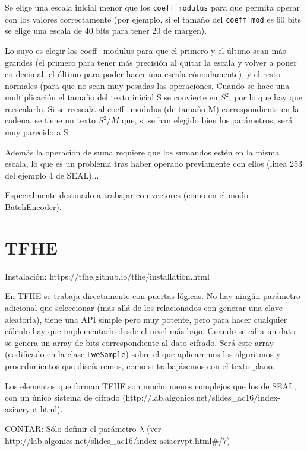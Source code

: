 \begin{itemize}
  Se elige una escala inicial menor que los \verb|coeff_modulus| para que permita operar con los valores correctamente (por ejemplo, si el tamaño del \verb|coeff_mod| es 60 bits se elige una escala de 40 bits para tener 20 de margen).

  Lo suyo es elegir los coeff\_modulus para que el primero y el último sean más grandes (el primero para tener más precisión al quitar la escala y volver a poner en decimal, el último para poder hacer una escala cómodamente), y el resto normales (para que no sean muy pesadas las operaciones. Cuando se hace una multiplicación el tamaño del texto inicial S se convierte en $S^2$, por lo que hay que reescalarlo. Si se reescala al coeff\_modulus (de tamaño M) correspondiente en la cadena, se tiene un texto $S^2/M$ que, si se han elegido bien los parámetros, será muy parecido a S.

  Además la operación de suma requiere que los sumandos estén en la misma escala, lo que es un problema tras haber operado previamente con ellos (linea 253 del ejemplo 4 de SEAL)...

  Especialmente destinado a trabajar con vectores (como en el modo BatchEncoder).

\end{itemize}

\section{TFHE}


Instalación: https://tfhe.github.io/tfhe/installation.html

En TFHE se trabaja directamente con puertas lógicas. No hay ningún parámetro adicional que seleccionar (mas allá de los relacionados con generar una clave aleatoria), tiene una API simple pero muy potente, pero para hacer cualquier cálculo hay que implementarlo desde el nivel más bajo. Cuando se cifra un dato se genera un array de bits correspondiente al dato cifrado. Será este array (codificado en la clase \verb|LweSample|) sobre el que aplicaremos los algoritmos y procedimientos que diseñaremos, como si trabajásemos con el texto plano.

Los elementos que forman TFHE son mucho menos complejos que los de SEAL, con un único sistema de cifrado (http://lab.algonics.net/slides_ac16/index-asiacrypt.html).

CONTAR: Sólo definir el parámetro $\lambda$ (ver http://lab.algonics.net/slides_ac16/index-asiacrypt.html#/7)


